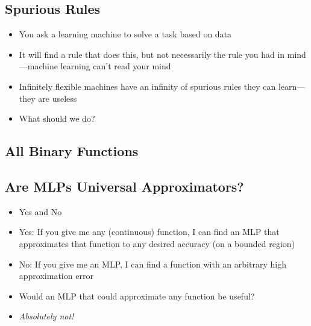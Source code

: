 
\begin{slide}
\section{Spurious Rules}

\begin{PauseHighLight}
  \begin{itemize}
  \item You ask a learning machine to solve a task based on data\pause
  \item It will find a rule that does this, but not necessarily the rule
    you had in mind\pause---machine learning can't read your
    mind\pauseb
  \item Infinitely flexible machines have an infinity of spurious
    rules they can learn\pause---they are useless\pauseb
  \item What should we do?\pause
  \end{itemize}
\end{PauseHighLight}

\end{slide}


\begin{slide}
\section[-2]{All Binary Functions}

\pb \pause {}
\begin{center}
  \pause
\end{center}
\end{slide}


\begin{slide}
\section{Are MLPs Universal Approximators?}
\pause
\begin{PauseHighLight}
  \begin{itemize}
  \item Yes\pauseb{} and No\pauseb
  \item Yes: If you give me any (continuous) function, I can find an MLP that
    approximates that function to any desired accuracy\pauseb{} {\small (on
    a bounded region)}\pauseb
  \item No: If you give me an MLP, I can find a function with an
    arbitrary high approximation error\pauseb
  \item Would an MLP that could approximate any function be
    useful?\pauseb
  \item \emph{Absolutely not!}\pauseb
  \end{itemize}
\end{PauseHighLight}

\end{slide}



